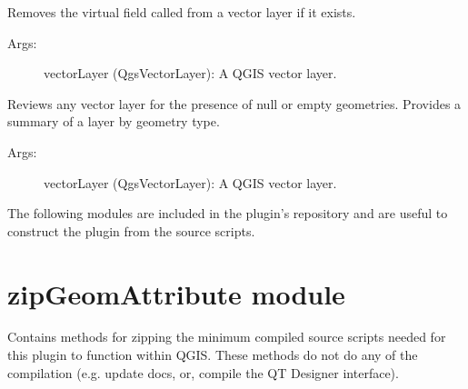 \documentclass[letterpaper,11pt,english]{sphinxmanual}
\begin{document}
\begin{fulllineitems}
\label{\detokenize{API:parseQGISGeometry.layerRemoveVirtualGeometryField}}
Removes the virtual field called  from a vector layer if it exists.
\begin{description}
\item[{Args:}] \leavevmode
vectorLayer (QgsVectorLayer):  A QGIS vector layer.

\end{description}

\end{fulllineitems}


\begin{fulllineitems}
\label{\detokenize{API:parseQGISGeometry.layer_review}}

Reviews any vector layer for the presence of null or empty geometries.  Provides a summary of a layer by geometry
type.
\begin{description}
\item[{Args:}] \leavevmode
vectorLayer (QgsVectorLayer):  A QGIS vector layer.

\end{description}

\end{fulllineitems}


The following modules are included in the plugin’s repository and are useful to construct the plugin from the source
scripts.


\section{zipGeomAttribute module}
\label{\detokenize{API:module-zipGeomAttribute}}\label{\detokenize{API:zipgeomattribute-module}}
Contains methods for zipping the minimum compiled source scripts needed for this plugin to function within QGIS.  These
methods do not do any of the compilation (e.g. update docs, or, compile the QT Designer interface).
\end{document}
